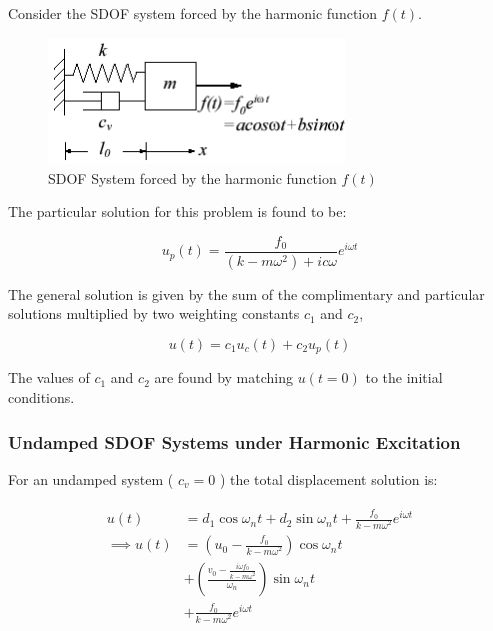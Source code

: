 \documentclass[10pt,b5paper,titlepage]{book}
\newenvironment{ematrix}
{
    \begin{eqnarray}
        \begin{aligned}
}
{
        \end{aligned}
    \end{eqnarray}
}
\begin{document}
Consider the SDOF system forced by the harmonic function $ f(t) $.

\begin{figure}[ht]
    \centering
    \includegraphics[width=0.70\textwidth]{img/SDOF_harmonic.png}
    \caption{SDOF System forced by the harmonic function $ f(t) $}
    \label{fig:SDOF-harmonic-response-png}
\end{figure}

The particular solution for this problem is found to be:

\begin{equation}
    u_p(t) = \frac{f_0}{ \left( k - m \omega^2 \right) + i c \omega} e^{i \omega t}
\end{equation}

The general solution is given by the sum of the complimentary and particular
solutions multiplied by two weighting constants $ c_1 $ and $ c_2 $,

\begin{equation}
    u(t) = c_1 u_c(t) + c_2 u_p(t)
\end{equation}

The values of $ c_1 $ and $ c_2 $ are found by matching $ u(t=0) $ to the
initial conditions.

\subsubsection{Undamped SDOF Systems under Harmonic Excitation}

For an undamped system ( $ c_v = 0 $ ) the total displacement solution is:

\begin{ematrix}
    u(t) &= d_1 \cos{\omega_n t} + d_2 \sin{\omega_n t} +
    \frac{f_0}{k - m \omega^2} e^{i \omega t}\\
    \implies u(t) &= \left( u_0 - \frac{f_0}{k - m \omega^2} \right) \cos{\omega_n t}\\
                  &+
    \left(\frac{v_0 - \frac{i \omega f_0}{k - m \omega^2}}{\omega_n} \right)
    \sin{\omega_n t}\\
                  &+ \frac{f_0}{k - m \omega^2} e^{i \omega t}
\end{ematrix}
\end{document}
